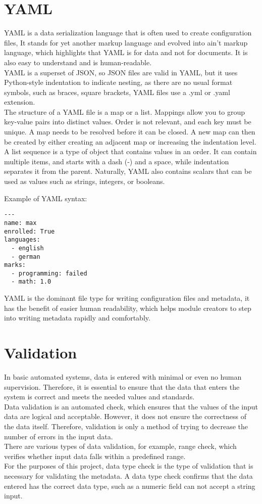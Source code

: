 \section{YAML}
YAML is a data serialization language that is often used to create configuration files,
It stands for yet another markup language and evolved into ain’t markup language,  which highlights that YAML is for data and not for documents. It is also easy to understand and is human-readable.\\
YAML is a superset of JSON, so JSON files are valid in YAML, but it uses Python-style indentation to indicate nesting, as there are no usual format symbols, such as braces, square brackets, YAML files use a .yml or .yaml extension.\\
The structure of a YAML file is a map or a list.
Mappings allow you to group key-value pairs into distinct values. Order is not relevant, and each key must be unique. A map needs to be resolved before it can be closed. A new map can then be created by either creating an adjacent map or increasing the indentation level.\\
A list sequence is a type of object that contains values in an order. It can contain multiple items, and starts with a dash (-) and a space, while indentation separates it from the parent.
Naturally, YAML also contains scalars that can be used as values such as strings, integers, or booleans\cite{yaml_redhat}.

Example of YAML syntax:

\begin{lstlisting}[caption=YAML example, style=pythonstyle]
---
name: max
enrolled: True
languages:
  - english
  - german
marks:
  - programming: failed
  - math: 1.0

\end{lstlisting}
YAML is the dominant file type for writing configuration files and metadata, it has the benefit of easier human readability, which helps module creators to step into writing metadata rapidly and comfortably.


\section{Validation}
In basic automated systems, data is entered with minimal or even no human supervision. Therefore, it is essential to ensure that the data that enters the system is correct and meets the needed values and standards\cite{BibEntry2021Jul}.\\
Data validation is an automated check, which ensures that the values of the input data are logical and acceptable. However, it does not ensure the correctness of the data itself. Therefore, validation is only a method of trying to decrease the number of errors in the input data.\\
There are various types of data validation, for example, range check, which verifies whether input data falls within a predefined range\cite{BibEntry2021Feb}.\\
For the purposes of this project, data type check is the type of validation that is necessary for validating the metadata. A data type check confirms that the data entered has the correct data type, such as a numeric field can not accept a string input.

